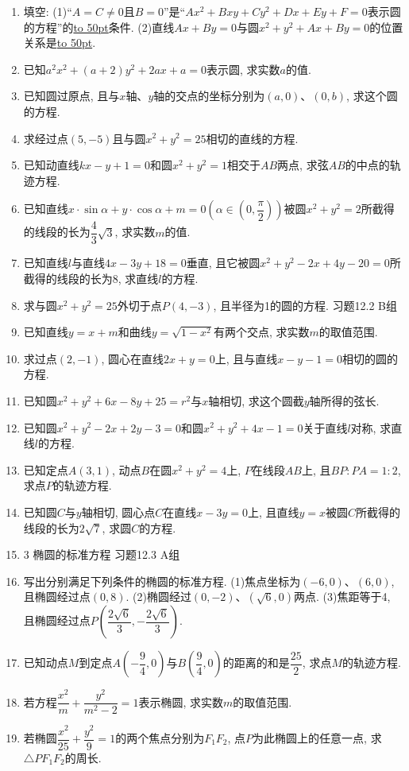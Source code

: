 \documentclass[10pt,a4paper]{article}
\newcommand{\blank}[1]{\underline{\hbox to #1pt{}}}
\begin{document}
\begin{enumerate}[1.]
\item 填空:
(1)``$A=C\ne 0$且$B=0$''是``$Ax^2+Bxy+Cy^2+Dx+Ey+F=0$表示圆的方程''的\blank{50}条件.
(2)直线$Ax+By=0$与圆$x^2+y^2+Ax+By=0$的位置关系是\blank{50}.
\item 已知$a^2x^2+(a+2)y^2+2ax+a=0$表示圆, 求实数$a$的值.
\item 已知圆过原点, 且与$x$轴、$y$轴的交点的坐标分别为$(a,0)$、$(0,b)$, 求这个圆的方程.
\item 求经过点$(5,-5)$且与圆$x^2+y^2=25$相切的直线的方程.
\item 已知动直线$kx-y+1=0$和圆$x^2+y^2=1$相交于$AB$两点, 求弦$AB$的中点的轨迹方程.
\item 已知直线$x\cdot \sin \alpha +y\cdot \cos \alpha +m=0(\alpha \in (0,\dfrac{\pi }2))$被圆$x^2+y^2=2$所截得的线段的长为$\dfrac 43\sqrt 3$, 求实数$m$的值.
\item 已知直线$l$与直线$4x-3y+18=0$垂直, 且它被圆$x^2+y^2-2x+4y-20=0$所截得的线段的长为8, 求直线$l$的方程.
\item 求与圆$x^2+y^2=25$外切于点$P(4,-3)$, 且半径为1的圆的方程.
习题12.2  B组
\item 已知直线$y=x+m$和曲线$y=\sqrt {1-x^2}$有两个交点, 求实数$m$的取值范围.
\item 求过点$(2,-1)$, 圆心在直线$2x+y=0$上, 且与直线$x-y-1=0$相切的圆的方程.
\item 已知圆$x^2+y^2+6x-8y+25=r^2$与$x$轴相切, 求这个圆截$y$轴所得的弦长.
\item 已知圆$x^2+y^2-2x+2y-3=0$和圆$x^2+y^2+4x-1=0$关于直线$l$对称, 求直线$l$的方程.
\item 已知定点$A(3,1)$, 动点$B$在圆$x^2+y^2=4$上, $P$在线段$AB$上, 且$BP:PA=1:2$, 求点$P$的轨迹方程.
\item 已知圆$C$与$y$轴相切, 圆心点$C$在直线$x-3y=0$上, 且直线$y=x$被圆$C$所截得的线段的长为$2\sqrt 7$, 求圆$C$的方程.
\item 3  椭圆的标准方程
习题12.3  A组
\item 写出分别满足下列条件的椭圆的标准方程.
(1)焦点坐标为$(-6,0)$、$(6,0)$, 且椭圆经过点$(0,8)$.
(2)椭圆经过$(0,-2)$、$(\sqrt 6,0)$两点.
(3)焦距等于4, 且椭圆经过点$P(\dfrac{2\sqrt 6}3,-\dfrac{2\sqrt 6}3)$.
\item 已知动点$M$到定点$A(-\dfrac 94,0)$与$B(\dfrac 94,0)$的距离的和是$\dfrac{25}2$, 求点$M$的轨迹方程.
\item 若方程$\dfrac{x^2}m+\dfrac{y^2}{{m^2}-2}=1$表示椭圆, 求实数$m$的取值范围.
\item 若椭圆$\dfrac{x^2}{25}+\dfrac{y^2}9=1$的两个焦点分别为$F_1F_2$, 点$P$为此椭圆上的任意一点, 求$\triangle PF_1F_2$的周长.

\end{enumerate}
\end{document}
